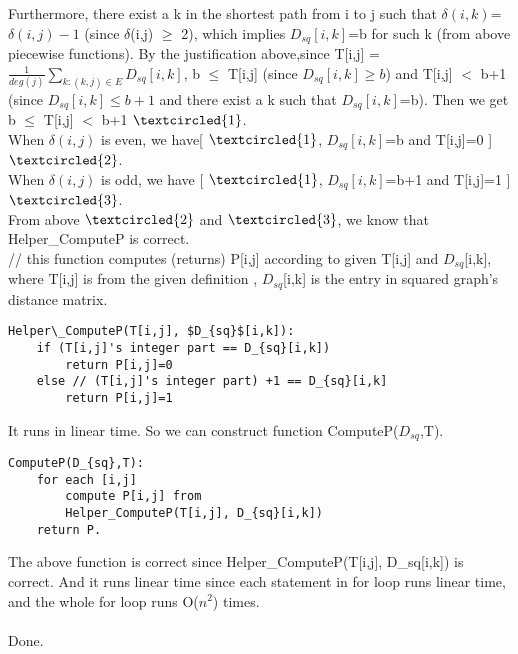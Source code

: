 \documentclass{article}
\begin{document}
 Furthermore, there exist a k in the shortest path from i to j such that $\delta(i,k)$=$\delta(i,j)-1$ (since $\delta$(i,j) $\geq$ 2), which implies $D_{sq}[i,k]$=b for such k (from above piecewise functions). By the justification above,since T[i,j] = $\frac{1}{deg(j)} \sum_{k:(k,j) \in E}^{} D_{sq}[i,k]$, 
 b $\leq$ T[i,j] (since $D_{sq}[i,k] \geq b$) and T[i,j] $<$ b+1 (since $D_{sq}[i,k] \leq b+1$ and there exist a k such that $D_{sq}[i,k]$=b). Then we get b $\leq$ T[i,j] $<$ b+1  $\textcircled{1}$.\\
When $\delta(i,j)$ is even, we have[ $\textcircled{1}$, $D_{sq}[i,k]$=b and T[i,j]=0 ] $\textcircled{2}$. \\When $\delta(i,j)$ is odd, we have [ $\textcircled{1}$, $D_{sq}[i,k]$=b+1 and T[i,j]=1 ] $\textcircled{3}$.\\
From above $\textcircled{2}$ and $\textcircled{3}$, we know that Helper\_ComputeP is correct.\\
// this function computes (returns) P[i,j] according to given 
T[i,j] and $D_{sq}$[i,k], where T[i,j] is from the given definition
, $D_{sq}$[i,k] is the entry in squared graph's distance matrix.
\begin{lstlisting}
Helper\_ComputeP(T[i,j], $D_{sq}$[i,k]):
	if (T[i,j]'s integer part == D_{sq}[i,k])
		return P[i,j]=0
	else // (T[i,j]'s integer part) +1 == D_{sq}[i,k]
		return P[i,j]=1
\end{lstlisting}
It runs in linear time.
So we can construct function ComputeP($D_{sq}$,T).
\begin{lstlisting}
ComputeP(D_{sq},T):
	for each [i,j] 
		compute P[i,j] from 
		Helper_ComputeP(T[i,j], D_{sq}[i,k])
	return P.
\end{lstlisting}
The above function is correct since Helper\_ComputeP(T[i,j], D\_{sq}[i,k]) is correct. And it runs linear time since each statement in for loop runs linear time, and the whole for loop runs O($n^2$) times.\\
\\Done.
\end{document}
